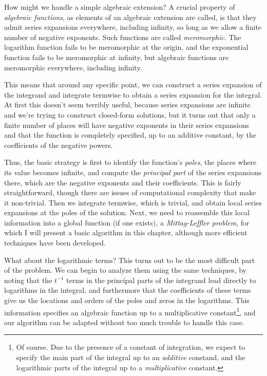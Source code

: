 How might we handle a simple algebraic extension?  A crucial property
of {\it algebraic functions}, as elements of an algebraic extension
are called, is that they admit series expansions everywhere, including
infinity, so long as we allow a finite number of negative exponents.
Such functions are called {\it meromorphic}.  The logarithm function
fails to be meromorphic at the origin, and the exponential function
fails to be meromorphic at infinity, but algebraic functions are
meromorphic everywhere, including infinity.

This means that around any specific point, we can construct a series
expansion of the integrand and integrate termwise to obtain a series
expansion for the integral.  At first this doesn't seem terribly
useful, because series expansions are infinite and we're trying to
construct closed-form solutions, but it turns out that only a finite
number of places will have negative exponents in their series
expansions and that the function is completely specified, up to an
additive constant, by the coefficients of the negative powers.

Thus, the basic strategy is first to identify the function's {\it
poles}, the places where its value becomes infinite, and compute the
{\it principal part} of the series expansions there, which are the
negative exponents and their coefficients.  This is fairly
straightforward, though there are issues of computational complexity
that make it non-trivial.  Then we integrate termwise, which is
trivial, and obtain local series expansions at the poles of the
solution.  Next, we need to reassemble this local information into a
global function (if one exists), a {\it Mittag-Leffler problem}, for
which I will present a basic algorithm in this chapter, although more
efficient techniques have been developed.

What about the logarithmic terms?  This turns out to be the most
difficult part of the problem.  We can begin to analyze them using the
same techniques, by noting that the $t^{-1}$ terms in the principal
parts of the integrand lead directly to logarithms in the integral,
and furthermore that the coefficients of these terms give us the
locations and orders of the poles and zeros in the logarithms.  This
information specifies an algebraic function up to a multiplicative
constant\footnote{Of course.  Due to the presence of a constant of
integration, we expect to specify the main part of the integral up to
an {\it additive} constand, and the logarithmic parts of the integral
up to a {\it multiplicative} constant.}, and our algorithm can be
adapted without too much trouble to handle this case.

